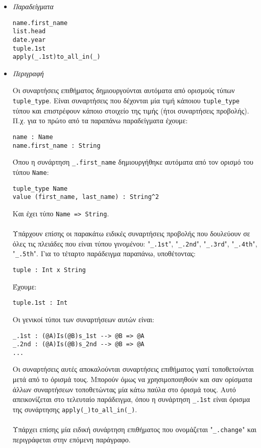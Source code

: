 \documentclass[diploma]{softlab-thesis}
\begin{document}
\begin{itemize}

\item \textit{Παραδείγματα}
\begin{verbatim}
name.first_name
list.head
date.year
tuple.1st
apply(_.1st)to_all_in(_)
\end{verbatim}

\item \textit{Περιγραφή}

Οι συναρτήσεις επιθήματος δημιουργούνται αυτόματα από ορισμούς τύπων
\verb|tuple_type|. Είναι συναρτήσεις που δέχονται μία τιμή κάποιου
\verb|tuple_type| τύπου και επιστρέφουν κάποιο στοιχείο της τιμής
(ήτοι συναρτήσεις προβολής).
Π.χ. για το πρώτο από τα παραπάνω παραδείγματα έχουμε:
\begin{verbatim}
name : Name
name.first_name : String
\end{verbatim}
Όπου η συνάρτηση \verb|_.first_name| δημιουργήθηκε αυτόματα από τον ορισμό
του τύπου \verb|Name|:
\begin{verbatim}
tuple_type Name
value (first_name, last_name) : String^2
\end{verbatim}
Και έχει τύπο \verb|Name => String|.
\\\\
Υπάρχουν επίσης οι παρακάτω ειδικές συναρτήσεις προβολής που δουλεύουν σε
όλες τις πλειάδες που είναι τύπου γινομένου:
"\verb|_.1st|", "\verb|_.2nd|", "\verb|_.3rd|", "\verb|_.4th|", "\verb|_.5th|".
Για το τέταρτο παράδειγμα παραπάνω, υποθέτοντας:
\begin{verbatim}
tuple : Int x String
\end{verbatim}
Έχουμε:
\begin{verbatim}
tuple.1st : Int
\end{verbatim}
Οι γενικοί τύποι των συναρτήσεων αυτών είναι:
\begin{verbatim}
_.1st : (@A)Is(@B)s_1st --> @B => @A
_.2nd : (@A)Is(@B)s_2nd --> @B => @A
...
\end{verbatim}
Οι συναρτήσεις αυτές αποκαλούνται συναρτήσεις επιθήματος γιατί τοποθετούνται
μετά από το όρισμά τους. Μπορούν όμως να χρησιμοποιηθούν και σαν ορίσματα άλλων
συναρτήσεων τοποθετώντας μία κάτω παύλα στο όρισμά τους.  Αυτό απεικονίζεται
στο τελευταίο παράδειγμα, όπου η συνάρτηση \verb|_.1st| είναι όρισμα της
συνάρτησης \verb|apply(_)to_all_in(_)|.
\\\\
Υπάρχει επίσης μία ειδική συνάρτηση επιθήματος που ονομάζεται "\verb|_.change|"
και περιγράφεται στην επόμενη παράγραφο.

\end{itemize}
\end{document}
